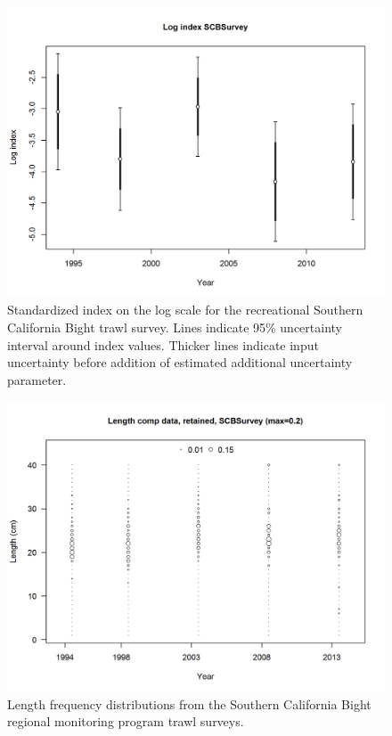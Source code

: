 \documentclass[12pt,]{article}
\begin{document}
\begin{figure}[htbp]
\centering
\includegraphics{r4ss/plots_mod1/index4_logcpuedata_SCBSurvey.png}
\caption{Standardized index on the log scale for the recreational
Southern California Bight trawl survey. Lines indicate 95\% uncertainty
interval around index values. Thicker lines indicate input uncertainty
before addition of estimated additional uncertainty parameter.
\label{fig:index4_logcpuedata_SCBSurvey}}
\end{figure}

\FloatBarrier 

\begin{figure}[htbp]
\centering
\includegraphics{r4ss/plots_mod1/comp_lendat_bubflt11mkt2.png}
\caption{Length frequency distributions from the Southern California
Bight regional monitoring program trawl surveys.
\label{fig:Fleet11_SCBsurvey_lendat_bubflt11mkt2}}
\end{figure}
\end{document}
